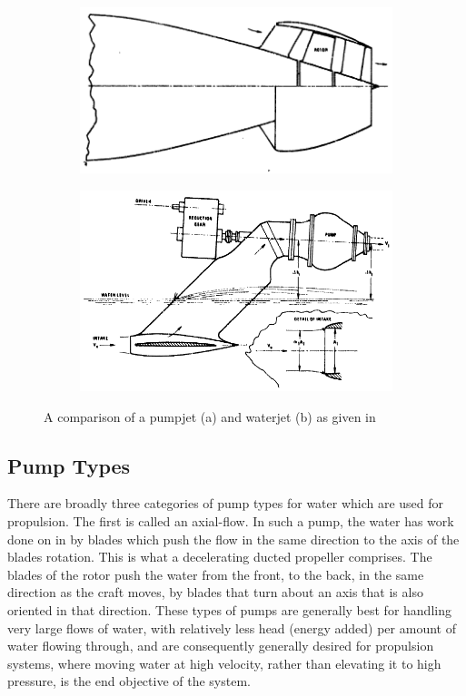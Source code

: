 \documentclass{article}\usepackage[]{graphicx}\usepackage[]{color}
\begin{document}
\begin{figure}[h]

\begin{subfigure}{0.5\textwidth}
\includegraphics[width=0.9\linewidth]{Pumpjet.png}
\caption{}
\end{subfigure}
\begin{subfigure}{0.5\textwidth}
\includegraphics[width=0.9\linewidth]{Waterjet.png}
\caption{}
\end{subfigure}


\caption{A comparison of a pumpjet (a) and waterjet (b) as given in \cite{wislicenus1973}}
\label{fig:PumpjetWaterjet.png}
\end{figure}

\subsection{Pump Types} \label{pumptypes}
There are broadly three categories of pump types for water which are used for propulsion.  The first is called an axial-flow. In such a pump, the water has work done on in by blades which push the flow in the same direction to the axis of the blades rotation.  This is what a decelerating ducted propeller comprises. The blades of the rotor push the water from the front, to the back, in the same direction as the craft moves, by blades that turn about an axis that is also oriented in that direction.  These types of pumps are generally best for handling very large flows of water, with relatively less head (energy added) per amount of water flowing through, and are consequently generally desired for propulsion systems, where moving water at high velocity, rather than elevating it to high pressure, is the end objective of the system.
\end{document}
